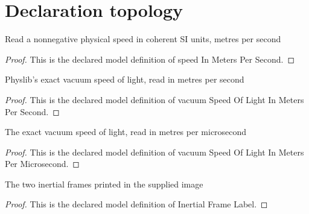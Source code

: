 \section{Declaration topology}
\begin{definition}
  \label{def:physics:phyx-mini-0633:phyxminiproblems-problemphyxmini0633-speedinmeterspersecond}
  Read a nonnegative physical speed in coherent SI units, metres per second
\end{definition}
\begin{proof}
  This is the declared model definition of speed In Meters Per Second.
\end{proof}
\begin{definition}
  \label{def:physics:phyx-mini-0633:phyxminiproblems-problemphyxmini0633-vacuumspeedoflightinmeterspersecond}
  Physlib's exact vacuum speed of light, read in metres per second
\end{definition}
\begin{proof}
  This is the declared model definition of vacuum Speed Of Light In Meters Per Second.
\end{proof}
\begin{definition}
  \label{def:physics:phyx-mini-0633:phyxminiproblems-problemphyxmini0633-vacuumspeedoflightinmeterspermicrosecond}
  The exact vacuum speed of light, read in metres per microsecond
\end{definition}
\begin{proof}
  This is the declared model definition of vacuum Speed Of Light In Meters Per Microsecond.
\end{proof}
\begin{definition}
  \label{def:physics:phyx-mini-0633:phyxminiproblems-problemphyxmini0633-inertialframelabel}
  The two inertial frames printed in the supplied image
\end{definition}
\begin{proof}
  This is the declared model definition of Inertial Frame Label.
\end{proof}
